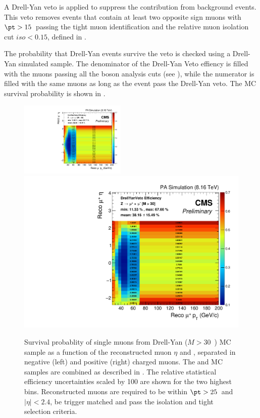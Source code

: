 A Drell-Yan veto is applied to suppress the contribution from \DYToMuMu background events. This veto removes events that contain at least two opposite sign muons with $\pt > 15$~\GeVc passing the tight muon identification and the relative muon isolation cut $iso < 0.15$, defined in  .

The probability that Drell-Yan events survive the veto is checked using a Drell-Yan simulated sample. The denominator of the Drell-Yan Veto effiency is filled with the muons passing all the \W boson  analysis cuts (see ), while the numerator is filled with the same muons as long as the event pass the Drell-Yan veto. The MC survival probability is shown in .

\begin{figure}[htb]
 \begin{center}
   \includegraphics[width=0.45\textwidth]{Figures/WBoson/Analysis/Efficiency/Muon/PA/eff2D_Pt_Eta_MC_ZToMuMu_M_30_Inf_PA_Minus_DrellYanVeto}
   \includegraphics[width=0.45	\textwidth]{Figures/WBoson/Analysis/Efficiency/Muon/PA/eff2D_Pt_Eta_MC_ZToMuMu_M_30_Inf_PA_Plus_DrellYanVeto}
   \caption{Survival probablity of single muons from Drell-Yan ($M > 30$~\GeVcc) MC sample  as a function of the reconstructed muon $\eta$ and \pt, separated in negative (left) and positive (right) charged muons. The \pPb and \Pbp MC samples are combined as described in . The relative statistical efficiency uncertainties scaled by 100 are shown for the two highest \pt bins. Reconstructed muons are required to be within $\pt > 25$~\GeVc and $|\eta| < 2.4$, be trigger matched and pass the isolation and tight selection criteria.}
   \label{fig:DrellYanVetoZEfficiency2D}
 \end{center}
\end{figure}



